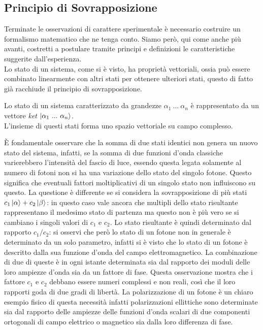 \subsection{Principio di Sovrapposizione}
Terminate le osservazioni di carattere sperimentale è necessario costruire un formalismo matematico che ne tenga conto. Siamo però, qui come anche più avanti, costretti a postulare tramite principi e definizioni le caratteristiche suggerite dall'esperienza.\\
Lo stato di un sistema, come si è visto, ha proprietà vettoriali, ossia può essere combinato linearmente con altri stati per ottenere ulteriori stati, questo di fatto già racchiude il principio di sovrapposizione.
\begin{definition}
    Lo stato di un sistema caratterizzato da grandezze $\alpha_1\ ...\ \alpha_n$ è rappresentato da un vettore \emph{ket} $\ket{\alpha_1\ ...\ \alpha_n}$.\\L'insieme di questi stati forma uno spazio vettoriale su campo complesso.
\end{definition}
È fondamentale osservare che la somma di due stati identici non genera un nuovo stato del sistema, infatti, se la somma di due funzioni d'onda classiche varierebbero l'intensità del fascio di luce, essendo questa legata solamente al numero di fotoni non si ha una variazione dello stato del singolo fotone. Questo significa che eventuali fattori moltiplicativi di un singolo stato non influiscono su questo. La questione è differente se si considera la sovrapposizione di più stati $c_1\ket{\alpha}+c_2\ket{\beta}$: in questo caso vale ancora che multipli dello stato risultante rappresentano il medesimo stato di partenza ma questo non è più vero se si cambiano i singoli valori di $c_1$ e $c_2$. Lo stato risultante è quindi determinato dal rapporto $c_1/c_2$: si osservi che però lo stato di un fotone non in generale è determinato da un solo parametro, infatti si è visto che lo stato di un fotone è descritto dalla sua funzione d'onda del campo elettromagnetico. La combinazione di due di queste è in ogni istante determinata sia dal rapporto dei moduli delle loro ampiezze d'onda sia da un fattore di fase. Questa osservazione mostra che i fattore $c_1$ e $c_2$ debbano essere numeri complessi e non reali, così che il loro rapporti goda di due gradi di libertà. La polarizzazione di un fotone è un chiaro esempio fisico di questa necessità infatti polarizzazioni ellittiche sono determinate sia dal rapporto delle ampiezze delle funzioni d'onda scalari di due componenti ortogonali di campo elettrico o magnetico sia dalla loro differenza di fase.\\

